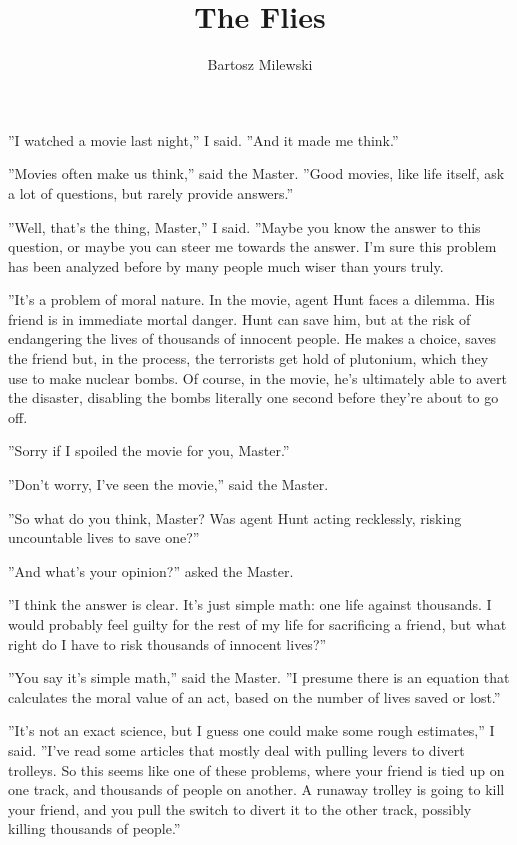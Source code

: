 \documentclass{memoir}
\author{Bartosz Milewski}
\title{The Flies}
\date{}
\begin{document}
\maketitle{}
''I watched a movie last night,'' I said. ''And it made me think.''

''Movies often make us think,'' said the Master. ''Good movies, like life itself, ask a lot of questions, but rarely provide answers.''

''Well, that's the thing, Master,'' I said. ''Maybe you know the answer to this question, or maybe you can steer me towards the answer. I'm sure this problem has been analyzed before by many people much wiser than yours truly.

''It's a problem of moral nature. In the movie, agent Hunt faces a dilemma. His friend is in immediate mortal danger. Hunt can save him, but at the risk of endangering the lives of thousands of innocent people. He makes a choice, saves the friend but, in the process, the terrorists get hold of plutonium, which they use to make nuclear bombs. Of course, in the movie, he's ultimately able to avert the disaster, disabling the bombs literally one second before they're about to go off. 

''Sorry if I spoiled the movie for you, Master.''

''Don't worry, I've seen the movie,'' said the Master.

''So what do you think, Master? Was agent Hunt acting recklessly, risking uncountable lives to save one?''

''And what's your opinion?'' asked the Master.

''I think the answer is clear. It's just simple math: one life against thousands. I would probably feel guilty for the rest of my life for sacrificing a friend, but what right do I have to risk thousands of innocent lives?''

''You say it's simple math,'' said the Master. ''I presume there is an equation that calculates the moral value of an act, based on the number of lives saved or lost.''

''It's not an exact science, but I guess one could make some rough estimates,'' I said. ''I've read some articles that mostly deal with pulling levers to divert trolleys. So this seems like one of these problems, where your friend is tied up on one track, and thousands of people on another. A runaway trolley is going to kill your friend, and you pull the switch to divert it to the other track, possibly killing thousands of people.''
\end{document}
